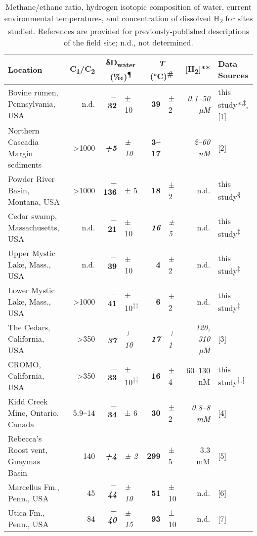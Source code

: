 
\begin{table}\centering
	\begin{threeparttable}
		\caption[C\textsubscript{1}/C\textsubscript{2}, δD\textsubscript{water}, current environmental temperatures, and {[}H\textsubscript{2}{]} for sites studied]{Methane/ethane ratio, hydrogen isotopic composition of
			water, current environmental temperatures, and concentration of
			dissolved H\textsubscript{2} for sites studied. References are provided
			for previously-published descriptions of the field site; n.d., not
			determined.}
		\label{tab:2:S4}
		
		\begin{tabular}{l r r@{\hspace{0.2em}}l r@{\hspace{0.2em}}l r l}
			\toprule
			Location & C\textsubscript{1}/C\textsubscript{2}
			\textsuperscript{\textbar{}\textbar{}} & \multicolumn{2}{c}{δD\textsubscript{water}
			(‰)\textsuperscript{¶}} & \multicolumn{2}{c}{\textit{T} (°C)\textsuperscript{\#}} & {[}H\textsubscript{2}{]}** & 
			Data Sources\tabularnewline
			\midrule
			Bovine rumen, Pennsylvania, USA & n.d. & \textbf{$-$32} & ±
			10 & \textbf{39} & ± 2 & \emph{0.1--50 µM} & this
			study*\textsuperscript{,‡}, {[}1{]}\tabularnewline
			Northern Cascadia Margin sediments & \textgreater{}1000 &
			\emph{\textbf{+5}} & \emph{± 10} & \textbf{3--17} & & \emph{2--60 nM} &
			{[}2{]}\tabularnewline
			Powder River Basin, Montana, USA & \textgreater{}1000 & \textbf{$-$136} &
			± 5 & \textbf{18} & ± 2 & n.d. & this
			study\textsuperscript{§}\tabularnewline
			Cedar swamp, Massachusetts, USA & n.d. &
			\textbf{$-$21} & ± 10 & \emph{\textbf{16}} & \emph{± 5} & n.d. & this
			study\textsuperscript{‡}\tabularnewline
			Upper Mystic Lake, Mass., USA & n.d. & \textbf{$-$39} & ± 10 &
			\textbf{4} & ± 2 & n.d. & this study\textsuperscript{‡}\tabularnewline
			Lower Mystic Lake, Mass., USA & \textgreater{}1000 &
			\textbf{$-$41} & ± 10\textsuperscript{††} & \textbf{6} & ± 2 & n.d. & this
			study\textsuperscript{‡}\tabularnewline
			The Cedars, California, USA & \textgreater{}350 & \emph{\textbf{$-$37}} &
			\emph{± 10} & \emph{\textbf{17}} & \emph{± 1} & \emph{120, 310 µM} &
			{[}3{]}\tabularnewline
			CROMO, California, USA &
			\textgreater{}350 & \textbf{$-$33} & ± 10\textsuperscript{††} & \textbf{16} & ± 4 & 60--130 nM
			& this study\textsuperscript{†,‡}\tabularnewline
			Kidd Creek Mine, Ontario, Canada & 5.9--14 & \textbf{$-$34} & ± 6
			& \textbf{30} & ± 2 & \emph{0.8--8 mM} & {[}4{]}\tabularnewline
			Rebecca's Roost vent, Guaymas Basin & 140 &
			\emph{\textbf{+4}} & \emph{± 2} & \textbf{299} & ± 5 & 3.3 mM &
			{[}5{]}\tabularnewline
			Marcellus Fm., Penn., USA & 45 & \emph{\textbf{$-$44}} &
			\emph{± 10} & \textbf{51} & ± 10 & n.d. & {[}6{]}\tabularnewline
			Utica Fm., Penn., USA & 84 & \emph{\textbf{$-$40}} &
			\emph{± 15} & \textbf{93} & ± 10 & n.d. & {[}7{]}\tabularnewline
			\bottomrule
		\end{tabular}


\end{threeparttable}
\end{table}
